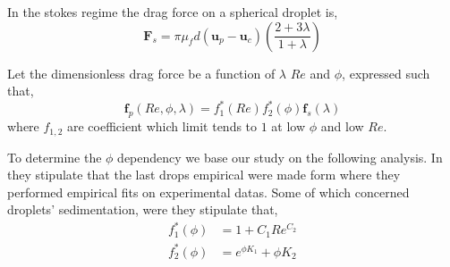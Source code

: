 In the stokes regime the drag force on a spherical droplet is, 
\begin{equation*}
    \textbf{F}_s
    =\pi \mu_f d (\textbf{u}_p - \textbf{u}_c) \left(\frac{2+3\lambda}{1+\lambda}\right)
\end{equation*}

Let the dimensionless drag force be a function of $\lambda$ $Re$ and $\phi$, expressed such that, 
\begin{equation}
    \textbf{f}_p(Re,\phi,\lambda)
    = 
    f_1^*(Re)
    f_2^*(\phi)
    \textbf{f}_s(\lambda)
\end{equation}
where $f_{1,2}$ are coefficient which limit tends to $1$ at low $\phi$ and low $Re$. 

To determine the $\phi$ dependency we base our study on the following analysis. 
In \cite[chapter 4]{ashgriz2011handbook} they stipulate that the last drops empirical were made form \citet{rusche2000effect} where they performed empirical fits on experimental datas. 
Some of which concerned droplets' sedimentation, were they stipulate that, 
\begin{align*}
    f_1^*(\phi) 
    &=1  + C_1 Re^{C_2}\\
    f_2^*(\phi) 
    &= e^{\phi K_1} + \phi K_2
\end{align*}

